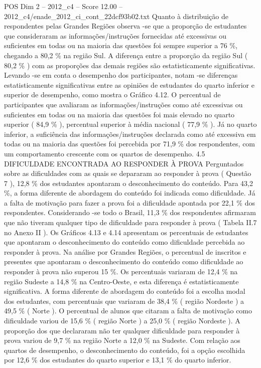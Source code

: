 \begin{textsample}{POS Dim 2 – 2012\_c4 – Score 12.00 – 2012\_c4/enade\_2012\_ci\_cont\_22dcf93b02.txt}
Quanto à distribuição de respondentes pelas Grandes Regiões observa -se que a proporção de estudantes que consideraram as informações/instruções fornecidas até excessivas ou suficientes em todas ou na maioria das questões foi sempre superior a 76 \%, chegando a 80,2 \% na região Sul.
A diferença entre a proporção da região Sul ( 80,2 \% ) com as proporções das demais regiões são estatisticamente significativas.
Levando -se em conta o desempenho dos participantes, notam -se diferenças estatisticamente significativas entre as opiniões de estudantes do quarto inferior e superior de desempenho, como mostra o Gráfico 4.12.
O percentual de participantes que avaliaram as informações/instruções como até excessivas ou suficientes em todas ou na maioria das questões foi mais elevado no quarto superior ( 84,9 \% ), percentual superior à média nacional ( 77,9 \% ).
Já no quarto inferior, a suficiência das informações/instruções declarada como até excessiva em todas ou na maioria das questões foi percebida por 71,9 \% dos respondentes, com um comportamento crescente com os quartos de desempenho. 4.5 DIFICULDADE ENCONTRADA AO RESPONDER À PROVA Perguntados sobre as dificuldades com as quais se depararam ao responder à prova ( Questão 7 ), 12,8 \% dos estudantes apontaram o desconhecimento do conteúdo.
Para 43,2 \%, a forma diferente de abordagem do conteúdo foi indicada como dificuldade.
Já a falta de motivação para fazer a prova foi a dificuldade apontada por 22,1 \% dos respondentes.
Considerando -se todo o Brasil, 11,3 \% dos respondentes afirmaram que não tiveram qualquer tipo de dificuldade para responder à prova ( Tabela II.7 no Anexo II ).
Os Gráficos 4.13 e 4.14 apresentam os percentuais de estudantes que apontaram o desconhecimento do conteúdo como dificuldade percebida ao responder à prova.
Na análise por Grandes Regiões, o percentual de inscritos e presentes que apontaram o desconhecimento do conteúdo como dificuldade ao responder à prova não superou 15 \%.
Os percentuais variaram de 12,4 \% na região Sudeste a 14,8 \% na Centro-Oeste, e esta diferença é estatisticamente significativa.
A forma diferente de abordagem do conteúdo foi a escolha modal dos estudantes, com percentuais que variaram de 38,4 \% ( região Nordeste ) a 49,5 \% ( Norte ).
O percentual de alunos que citaram a falta de motivação como dificuldade variou de 15,6 \% ( região Norte ) a 25,0 \% ( região Nordeste ).
A proporção dos que declararam não ter qualquer dificuldade para responder à prova variou de 9,7 \% na região Norte a 12,0 \% na Sudeste.
Com relação aos quartos de desempenho, o desconhecimento do conteúdo, foi a opção escolhida por 12,6 \% dos estudantes do quarto superior e 13,1 \% do quarto inferior.

\end{textsample}
